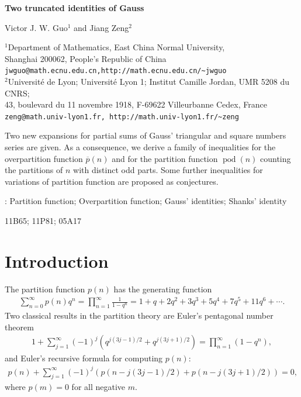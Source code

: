 \documentclass[12pt]{article}
\theoremstyle{remark}
\DeclareMathOperator{\podd}{pod}
\numberwithin{equation}{section}
\begin{document}

\begin{center}
{\Large\bf Two truncated identities of Gauss}
\end{center}

\vskip 2mm \centerline{Victor J. W. Guo$^1$  and Jiang Zeng$^{2}$}
\begin{center}
{\footnotesize $^1$Department of Mathematics, East China Normal University,\\ Shanghai 200062,
 People's Republic of China\\
{\tt jwguo@math.ecnu.edu.cn,\quad http://math.ecnu.edu.cn/\textasciitilde{jwguo}}\\[10pt]
$^2$Universit\'e de Lyon; Universit\'e Lyon 1; Institut Camille
Jordan, UMR 5208 du CNRS;\\ 43, boulevard du 11 novembre 1918,
F-69622 Villeurbanne Cedex, France\\
{\tt zeng@math.univ-lyon1.fr,\quad
http://math.univ-lyon1.fr/\textasciitilde{zeng}} }
\end{center}


\vskip 0.7cm 
Two  new expansions for partial sums of Gauss' triangular and
square numbers series are given. As a consequence, we derive a family of inequalities for
 the overpartition function $\overline{p}(n)$ and for the  partition function $\podd (n)$ counting the partitions of $n$ with distinct odd parts.
Some further  inequalities for variations of partition function are proposed as conjectures.



\vskip 3mm : Partition function; Overpartition function; Gauss' identities; Shanks' identity

\vskip 0.2cm  11B65; 11P81; 05A17


\section{Introduction}
The partition function $p(n)$ has the generating function
\begin{align*}
\sum_{n=0}^{\infty} p(n) q^n
=\prod_{n=1}^\infty \frac{1}{1-q^n}=1+q+2q^2+3q^3+5q^4+7q^5+11q^6+\cdots.  %
\end{align*}
Two classical results in the partition theory \cite[p.~11]{Andrews98}  are  Euler's pentagonal number theorem
\begin{align}
1+\sum_{j=1}^{\infty} (-1)^j (q^{j(3j-1)/2}+q^{j(3j+1)/2})
=\prod_{n=1}^\infty (1-q^n), \label{eq:euler2}
\end{align}
and Euler's  recursive  formula for computing
$p(n)$:
\begin{align}\label{eq:recur1}
p(n)+\sum_{j=1}^{\infty} (-1)^{j}(p(n-j(3j-1)/2)+p(n-j(3j+1)/2))= 0,
\end{align}
where $p(m)=0$ for all negative $m$.
\end{document}

